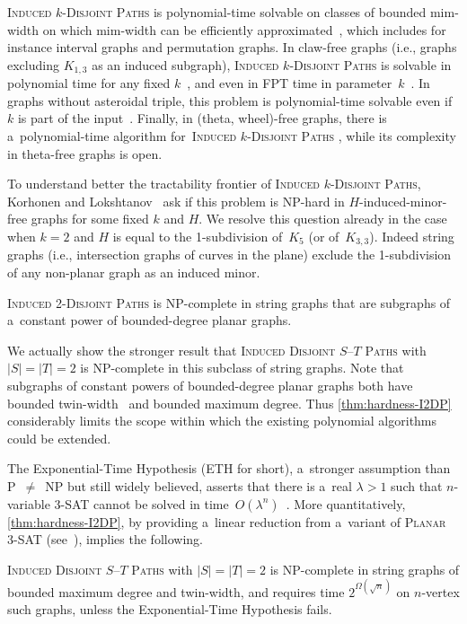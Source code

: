 \documentclass[a4paper,UKenglish,cleveref,autoref]{lipics-v2021}
\begin{document}
\textsc{Induced $k$-Disjoint Paths} is polynomial-time solvable on classes of bounded mim-width on which mim-width can be efficiently approximated~\cite{Jaffke20}, which includes for instance interval graphs and permutation graphs.
In claw-free graphs (i.e., graphs excluding $K_{1,3}$ as an induced subgraph), \textsc{Induced $k$-Disjoint Paths} is solvable in polynomial time for any fixed $k$~\cite{DBLP:journals/algorithmica/FialaKLP12}, and even in FPT time in parameter~$k$~\cite{DBLP:journals/siamdm/GolovachPL15}.
In graphs without asteroidal triple, this problem is polynomial-time solvable even if~$k$ is part of the input~\cite{GolovachPL22}.
Finally, in (theta, wheel)-free graphs, there is a~polynomial-time algorithm for~\textsc{Induced $k$-Disjoint Paths} \cite{RadovanovicTV21}, while its complexity in theta-free graphs is open.

To understand better the tractability frontier of \textsc{Induced $k$-Disjoint Paths}, Korhonen and Lokshtanov~\cite{KorhonenL23} ask if this problem is NP-hard in \mbox{$H$-induced}-minor-free graphs for some fixed $k$ and $H$.
We resolve this question already in the case when $k=2$ and $H$ is equal to the 1-subdivision of~$K_5$ (or of~$K_{3,3}$).
Indeed string graphs (i.e., intersection graphs of curves in the plane) exclude the 1-subdivision of any non-planar graph as an induced minor.  

\begin{theorem}\label{thm:hardness-I2DP}
  \textsc{Induced 2-Disjoint Paths} is NP-complete in string graphs that are subgraphs of a~constant power of bounded-degree planar graphs.
\end{theorem}

We actually show the stronger result that \textsc{Induced Disjoint $S$--$T$ Paths} with $|S|=|T|=2$ is NP-complete in this subclass of string graphs. 
Note that subgraphs of constant powers of bounded-degree planar graphs both have bounded twin-width~\cite{twin-width1,twin-width2} and bounded maximum degree.
Thus \cref{thm:hardness-I2DP} considerably limits the scope within which the existing polynomial algorithms could be extended.

The Exponential-Time Hypothesis (ETH for short), a~stronger assumption than \mbox{P $\neq$ NP} but still widely believed, asserts that there is a~real $\lambda>1$ such that $n$-variable \textsc{3-SAT} cannot be solved in time~$O(\lambda^n)$~\cite{Impagliazzo01}.
More quantitatively, \cref{thm:hardness-I2DP}, by providing a~linear reduction from a~variant of \textsc{Planar 3-SAT} (see~\cite{Lichtenstein82}), implies the following.
\begin{corollary}\label{cor:tww}
  \textsc{Induced Disjoint $S$--$T$ Paths} with $|S|=|T|=2$ is NP-complete in string graphs of bounded maximum degree and twin-width, and requires time $2^{\Omega(\sqrt n)}$ on $n$-vertex such graphs, unless the Exponential-Time Hypothesis fails.
\end{corollary}
\end{document}
